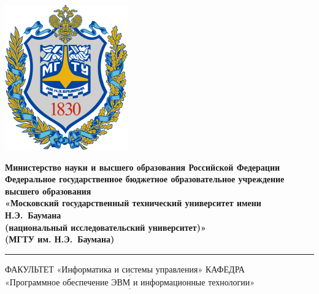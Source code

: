 \documentclass[12pt]{report}
\begin{document}
\begin{titlepage}

	\fontsize{12pt}{12pt}\selectfont
	\noindent \begin{minipage}{0.15\textwidth}
		\includegraphics[width=\linewidth]{b_logo.png}
	\end{minipage}
	\noindent\begin{minipage}{0.9\textwidth}\centering
		\textbf{Министерство науки и высшего образования Российской Федерации}\\
		\textbf{Федеральное государственное бюджетное образовательное учреждение высшего образования}\\
		\textbf{«Московский государственный технический университет имени Н.Э.~Баумана}\\
		\textbf{(национальный исследовательский университет)»}\\
		\textbf{(МГТУ им. Н.Э.~Баумана)}
	\end{minipage}
	
	\noindent\rule{18cm}{3pt}
	\newline\newline
	\noindent ФАКУЛЬТЕТ $\underline{\textbf{«Информатика и системы управления»}}$ \newline\newline
	\noindent КАФЕДРА $\underline{\textbf{«Программное обеспечение ЭВМ и информационные технологии»}}$\newline\newline\newline\newline
	

\end{titlepage}
\end{document}

